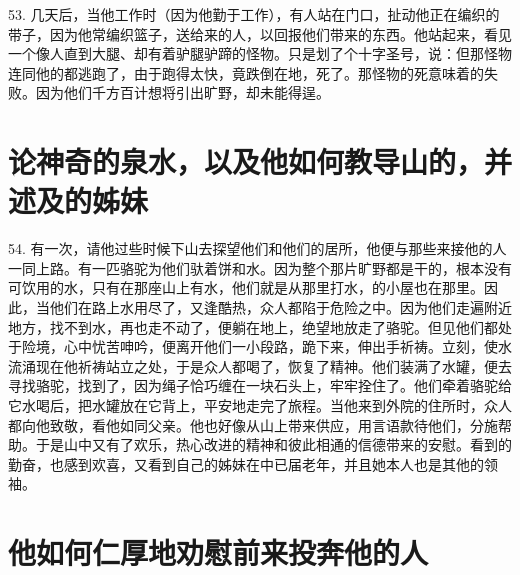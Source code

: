53. 几天后，当他工作时（因为他勤于工作），有人站在门口，扯动他正在编织的带子，因为他常编织篮子，送给来的人，以回报他们带来的东西。他站起来，看见一个像人直到大腿、却有着驴腿驴蹄的怪物。只是划了个十字圣号，说：但那怪物连同他的都逃跑了，由于跑得太快，竟跌倒在地，死了。那怪物的死意味着的失败。因为他们千方百计想将引出旷野，却未能得逞。\par


\section{论神奇的泉水，以及他如何教导山的，并述及的姊妹}

54. 有一次，请他过些时候下山去探望他们和他们的居所，他便与那些来接他的人一同上路。有一匹骆驼为他们驮着饼和水。因为整个那片旷野都是干的，根本没有可饮用的水，只有在那座山上有水，他们就是从那里打水，的小屋也在那里。因此，当他们在路上水用尽了，又逢酷热，众人都陷于危险之中。因为他们走遍附近地方，找不到水，再也走不动了，便躺在地上，绝望地放走了骆驼。但见他们都处于险境，心中忧苦呻吟，便离开他们一小段路，跪下来，伸出手祈祷。立刻，使水流涌现在他祈祷站立之处，于是众人都喝了，恢复了精神。他们装满了水罐，便去寻找骆驼，找到了，因为绳子恰巧缠在一块石头上，牢牢拴住了。他们牵着骆驼给它水喝后，把水罐放在它背上，平安地走完了旅程。当他来到外院的住所时，众人都向他致敬，看他如同父亲。他也好像从山上带来供应，用言语款待他们，分施帮助。于是山中又有了欢乐，热心改进的精神和彼此相通的信德带来的安慰。看到的勤奋，也感到欢喜，又看到自己的姊妹在中已届老年，并且她本人也是其他的领袖。\par


\section{他如何仁厚地劝慰前来投奔他的人}

